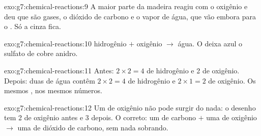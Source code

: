 \begin{solution}{exo:g7:chemical-reactions:9}
A maior parte da madeira reagiu com o oxigênio e deu  que são
gases, o dióxido de carbono e o vapor de água, que vão embora para o .
Só a cinza fica.
\end{solution}

\begin{solution}{exo:g7:chemical-reactions:10}
hidrogênio $+$ oxigênio $\longrightarrow$ água. O  deixa azul o
sulfato de cobre anidro.
\end{solution}

\begin{solution}{exo:g7:chemical-reactions:11}
Antes: $2 \times 2 = 4$  de hidrogênio e 2  de oxigênio.
Depois: duas  de água contêm $2 \times 2 = 4$  de
hidrogênio e $2 \times 1 =
2$  de oxigênio. Os mesmos , nos mesmos números.
\end{solution}

\begin{solution}{exo:g7:chemical-reactions:12}
Um  de oxigênio não pode surgir do nada: o desenho tem 2  de
oxigênio antes e 3 depois. O correto: um  de carbono $+$ uma
 de oxigênio
$\longrightarrow$ uma  de dióxido de carbono, sem nada sobrando.
\end{solution}

